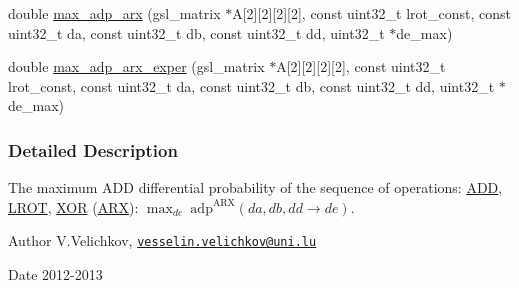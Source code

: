\begin{DoxyCompactItemize}
\item 
double \hyperlink{max-adp-arx_8cc_a661c329bf4379aac10838bd72310cebd}{max\-\_\-adp\-\_\-arx} (gsl\-\_\-matrix $\ast$\-A\mbox{[}2\mbox{]}\mbox{[}2\mbox{]}\mbox{[}2\mbox{]}\mbox{[}2\mbox{]}, const uint32\-\_\-t lrot\-\_\-const, const uint32\-\_\-t da, const uint32\-\_\-t db, const uint32\-\_\-t dd, uint32\-\_\-t $\ast$de\-\_\-max)
\item 
double \hyperlink{max-adp-arx_8cc_abfb1c22b9460ed0c2bb71497e214f75c}{max\-\_\-adp\-\_\-arx\-\_\-exper} (gsl\-\_\-matrix $\ast$\-A\mbox{[}2\mbox{]}\mbox{[}2\mbox{]}\mbox{[}2\mbox{]}\mbox{[}2\mbox{]}, const uint32\-\_\-t lrot\-\_\-const, const uint32\-\_\-t da, const uint32\-\_\-t db, const uint32\-\_\-t dd, uint32\-\_\-t $\ast$de\-\_\-max)
\end{DoxyCompactItemize}


\subsubsection{\-Detailed \-Description}
\-The maximum \-A\-D\-D differential probability of the sequence of operations\-: \hyperlink{common_8hh_af3b709fb668cf93ca09e2a46a2a031a8}{\-A\-D\-D}, \hyperlink{common_8hh_abe2030c44a97657e1b1dbe9b0e093a7b}{\-L\-R\-O\-T}, \hyperlink{common_8hh_a6de9ec3b3b57377b69a82239ea52ec6e}{\-X\-O\-R} (\hyperlink{common_8hh_a7d3da57c58af293c7c57e4f1b551849d}{\-A\-R\-X})\-: $\max_{de}~\mathrm{adp}^{\mathrm{ARX}}(da,db,dd \rightarrow de)$. \begin{DoxyAuthor}{\-Author}
\-V.\-Velichkov, \href{mailto:vesselin.velichkov@uni.lu}{\tt vesselin.\-velichkov@uni.\-lu} 
\end{DoxyAuthor}
\begin{DoxyDate}{\-Date}
2012-\/2013 
\end{DoxyDate}



